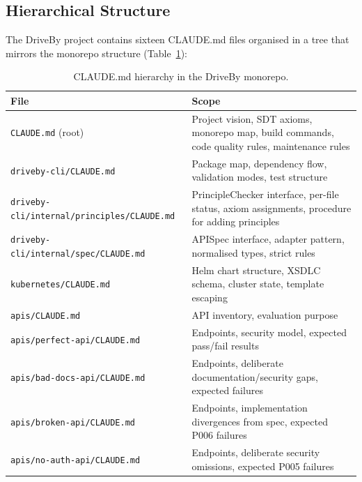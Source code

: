 \subsection{Hierarchical Structure}
\label{subsec:hierarchy}

The DriveBy project contains sixteen CLAUDE.md files organised in a tree that mirrors the monorepo structure (Table~\ref{tab:claudemd-hierarchy}):

\begin{table}[htbp]
\centering
\caption{CLAUDE.md hierarchy in the DriveBy monorepo.}
\label{tab:claudemd-hierarchy}
\small
\begin{tabular}{@{}p{} p{}@{}}
\toprule
\textbf{File} & \textbf{Scope} \\
\midrule
\texttt{CLAUDE.md} (root)                          & Project vision, SDT axioms, monorepo map, build commands, code quality rules, maintenance rules \\
\texttt{driveby-cli/CLAUDE.md}                     & Package map, dependency flow, validation modes, test structure \\
\texttt{driveby-cli/\allowbreak internal/principles/\allowbreak CLAUDE.md}  & PrincipleChecker interface, per-file status, axiom assignments, procedure for adding principles \\
\texttt{driveby-cli/\allowbreak internal/spec/\allowbreak CLAUDE.md}        & APISpec interface, adapter pattern, normalised types, strict rules \\
\texttt{kubernetes/CLAUDE.md}                       & Helm chart structure, XSDLC schema, cluster state, template escaping \\
\texttt{apis/CLAUDE.md}                            & API inventory, evaluation purpose \\
\texttt{apis/perfect-api/CLAUDE.md}                 & Endpoints, security model, expected pass/fail results \\
\texttt{apis/bad-docs-api/CLAUDE.md}               & Endpoints, deliberate documentation/security gaps, expected failures \\
\texttt{apis/broken-api/CLAUDE.md}                  & Endpoints, implementation divergences from spec, expected P006 failures \\
\texttt{apis/no-auth-api/CLAUDE.md}                 & Endpoints, deliberate security omissions, expected P005 failures \\

\end{tabular}
\end{table}
